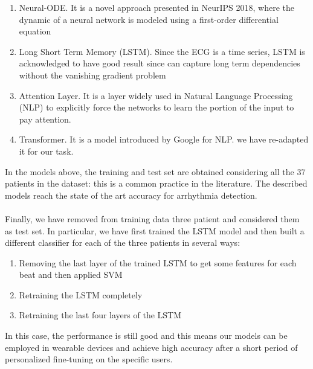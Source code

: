 \documentclass[LaM,binding=0.6cm]{sapthesis}
\begin{document}
\begin{enumerate}
\item Neural-ODE. It is a novel approach presented in NeurIPS 2018, where the dynamic of a neural network is modeled using a first-order differential equation
\item Long Short Term Memory (LSTM). Since the ECG is a time series, LSTM is acknowledged to have good result since can capture long term dependencies without the vanishing gradient problem
\item Attention Layer. It is a layer widely used in Natural Language Processing (NLP) to explicitly force the networks to learn the portion of the input to pay attention. 
\item Transformer. It is a model introduced by Google for NLP. we have re-adapted it for our task.
\end{enumerate}  
In the models above, the training and test set are obtained considering all the 37 patients in the dataset: this is a common practice in the literature. The described models reach the state of the art accuracy for arrhythmia detection.\\\\Finally, we have removed from training data three patient and considered them as test set. In particular, we have first trained the LSTM model and then built a different classifier for each of the three patients in several ways:
\begin{enumerate}
\item Removing the last layer of the trained LSTM to get some features for each beat and then applied SVM
\item Retraining the LSTM completely 
\item Retraining the last four layers of the LSTM 
\end{enumerate}
In this case, the performance is still good and this means our models can be employed in wearable devices and achieve high accuracy after a short period of personalized fine-tuning on the specific users.   
\end{document}
